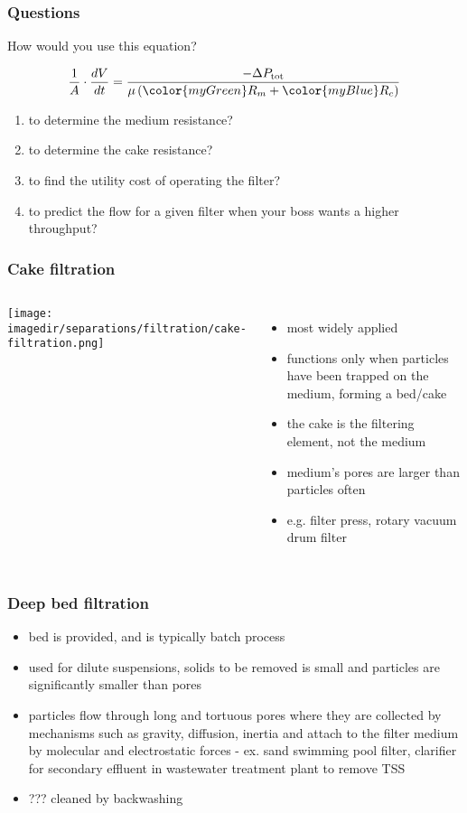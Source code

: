 \begin{frame}\frametitle{Questions}
	How would you use this equation?
	\begin{exampleblock}{}
		\[\dfrac{1}{A} \cdot \dfrac{dV}{dt} = \dfrac{-\Delta P_\text{tot}}{\mu \left({\color{myGreen}R_m} + {\color{myBlue}R_c} \right)}\]
	\end{exampleblock}

	\begin{enumerate}
		\item	to determine the medium resistance?
		\item	to determine the cake resistance?
		\item	to find the utility cost of operating the filter?
		\item	to predict the flow for a given filter when your boss wants a higher throughput?
	\end{enumerate}
\end{frame}

\begin{frame}\frametitle{Cake filtration}
	\begin{columns}[t]
			\begin{center}
				\texttt{[image: \\imagedir/separations/filtration/cake-filtration.png]}
			\end{center}

			\begin{itemize}
				\item	most widely applied
				\item	functions only when particles have been trapped on the medium, forming a bed/cake
				\item	the cake is the filtering element, not the medium
				\item	medium's pores are larger than particles often
				\item	e.g. filter press, rotary vacuum drum filter
			\end{itemize}
	\end{columns}

\end{frame}

\begin{frame}\frametitle{Deep bed filtration}
	\begin{itemize}
		\item	bed is provided, and is typically batch process
		\item	used for dilute suspensions, solids to be removed is small and particles are significantly smaller than pores
		\item	particles flow through long and tortuous pores where they are collected by mechanisms such as gravity, diffusion, inertia and attach to the filter medium by molecular and electrostatic forces - ex. sand swimming pool filter, clarifier for secondary effluent in wastewater treatment plant to remove TSS
		\item	??? cleaned by backwashing
	\end{itemize}
\end{frame}

